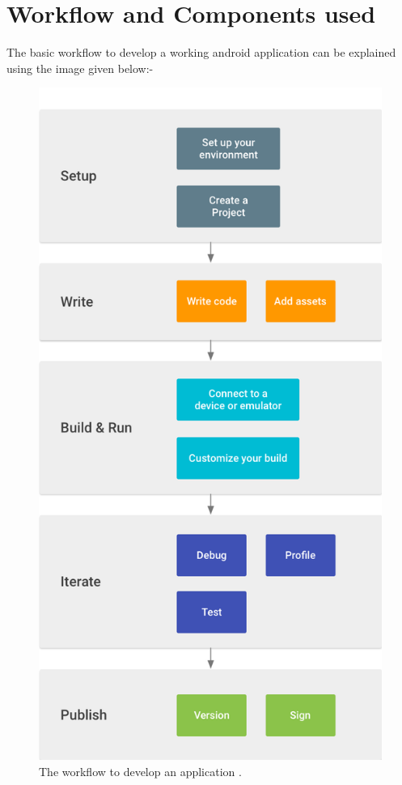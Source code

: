 \documentclass[11pt,a4paper]{report}
\begin{document}
 \chapter{Workflow and Components used}

The basic workflow to develop a working android application can be explained using the image given below:-
\begin{figure}[H]
	\centering
	\includegraphics[scale=0.3]{./img/developer-workflow_2x.png}
	\caption{The workflow to develop an application .}
\end{figure}
\vskip 7cm
\end{document}
